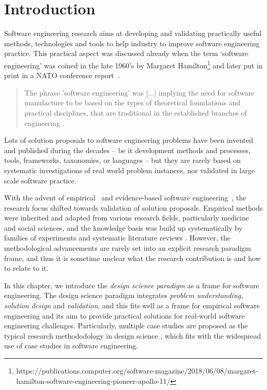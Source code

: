 \documentclass[graybox]{svmult}
\begin{document}
\section{Introduction}
\label{sec:intro}


Software engineering research aims at developing and validating practically useful methods, technologies and tools to help industry to improve software engineering practice. This practical aspect was discussed already when the term `software engineering' was coined in the late 1960's by Margaret Hamilton\footnote{https://publications.computer.org/software-magazine/2018/06/08/margaret-hamilton-software-engineering-pioneer-apollo-11/} and later put in print in a NATO conference report~\cite{Nato1968}. 

\begin{quote}
{The phrase 'software engineering' was [...] implying the need for software manufacture to be based on the types of theoretical foundations and practical disciplines, that are traditional in the established branches of engineering} \cite[p13]{Nato1968}. 
\end{quote}

Lots of solution proposals to software engineering problems have been invented and published during the decades -- be it development methods and processes, tools, frameworks, taxonomies, or languages -- but they are rarely based on systematic investigations of real world problem instances, nor validated in large scale software practice.

With the advent of empirical~\cite{Basili86} and evidence-based software engineering~\cite{Kitchenham04}, the research focus shifted towards validation of solution proposals. Empirical methods were inherited and adapted from various research fields, particularly medicine and social sciences, and the knowledge basis was build up systematically by families of experiments \cite{Basili99} and systematic literature reviews \cite{Kitchenham15}. However, the methodological advancements are rarely set into an explicit research paradigm frame, and thus it is sometime unclear what the research contribution is and how to relate to it. 

In this chapter, we introduce the \emph{design science paradigm} as a frame for software engineering. The design science paradigm integrates \emph{problem understanding, solution design} and \emph{validation}, and this fits well as a frame for empirical software engineering and its aim to provide practical solutions for real-world software engineering challenges. Particularly, multiple case studies are proposed as the typical research methododology in design science \cite{van_aken_management_2004}, which fits with the widespread use of case studies in software engineering.
\end{document}
